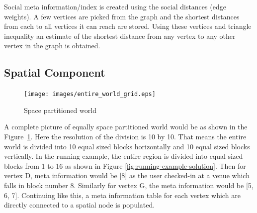
Social meta information/index is created using the social distances (edge weights). A few vertices are picked from the graph and the shortest distances from each to all vertices it can reach are stored. Using these vertices and triangle inequality an estimate of the shortest distance from any vertex to any other vertex in the graph is obtained.

\subsection{Spatial Component}

\begin{figure}[t]
	\centering \texttt{[image: images/entire\_world\_grid.eps]}
    \caption{Space partitioned world}
    \label{fig:space-partitioned}
\end{figure}

A complete picture of equally space partitioned world would be as shown in the Figure~\ref{fig:space-partitioned}. Here the resolution of the division is 10 by 10. That means the entire world is divided into 10 equal sized blocks horizontally and 10 equal sized blocks vertically. In the running example, the entire region is divided into equal sized blocks from 1 to 16 as shown in Figure \ref{fig:running-example-solution}. Then for vertex D, meta information would be [8] as the user checked-in at a venue which falls in block number 8. Similarly for vertex G, the meta information would be [5, 6, 7]. Continuing like this, a meta information table for each vertex which are directly connected to a spatial node is populated.


